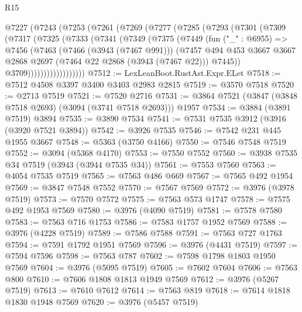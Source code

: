 \begin{lexlean}{R15}
\begin{coremodule}
    @7227
      (@7243
        (@7253
          (@7261
            (@7269
              (@7277
                (@7285
                  (@7293
                    (@7301
                      (@7309
                        (@7317
                          (@7325
                            (@7333
                              (@7341
                                (@7349
                                  (@7375
                                    (@7449
                                      (fun ("_" : @6955) =>
                                      @7456
                                        (@7463
                                          (@7466 (@3943 (@7467 @991)))
                                          (@7457
                                            @494
                                            @453
                                            @3667
                                            @3667
                                            @2868
                                            @2697
                                            (@7464 @22 @2868 (@3943 (@7467 @22)))
                                            @7445))
                                        @3709))))))))))))))))))
@7512 := LexLeanBoot.RustAst.Expr.ELet
@7518 := @7512 @4508 @3397 @3400 @3403 @2983 @2815
@7519 := @3570 @7518
@7520 := @2713 @7519
@7521 := @7520 @2716
@7531 := @3864 @7521 (@3847 (@3848 @7518 @2693) (@3094 (@3741 @7518 @2693))) @1957
@7534 := @3884 (@3891 @7519) @3894
@7535 := @3890 @7534
@7541 := @7531 @7535 @3912 (@3916 (@3920 @7521 @3894))
@7542 := @3926 @7535
@7546 := @7542 @231 @445 @1955 @3667
@7548 := @5363 (@3750 @4166)
@7550 := @7546 @7548 @7519
@7552 := @3094 (@5368 @4170)
@7553 := @7550 @7552
@7560 := @3938 @7535 @34 @7519 (@3943 (@3944 @7535 @34))
@7561 := @7553 @7560
@7563 := @4054 @7535 @7519
@7565 := @7563 @486 @669
@7567 := @7565 @492 @1954
@7569 := @3847 @7548 @7552
@7570 := @7567 @7569
@7572 := @3976 (@3978 @7519)
@7573 := @7570 @7572
@7575 := @7563 @573 @1747
@7578 := @7575 @492 @1953 @7569
@7580 := @3976 (@4090 @7519)
@7581 := @7578 @7580
@7583 := @7563 @716 @1753
@7586 := @7583 @1757 @1952 @7569
@7588 := @3976 (@4228 @7519)
@7589 := @7586 @7588
@7591 := @7563 @727 @1763
@7594 := @7591 @1792 @1951 @7569
@7596 := @3976 (@4431 @7519)
@7597 := @7594 @7596
@7598 := @7563 @787
@7602 := @7598 @1798 @1803 @1950 @7569
@7604 := @3976 (@5095 @7519)
@7605 := @7602 @7604
@7606 := @7563 @800
@7610 := @7606 @1808 @1813 @1949 @7569
@7612 := @3976 (@5267 @7519)
@7613 := @7610 @7612
@7614 := @7563 @819
@7618 := @7614 @1818 @1830 @1948 @7569
@7620 := @3976 (@5457 @7519)

\end{coremodule}
\end{lexlean}
